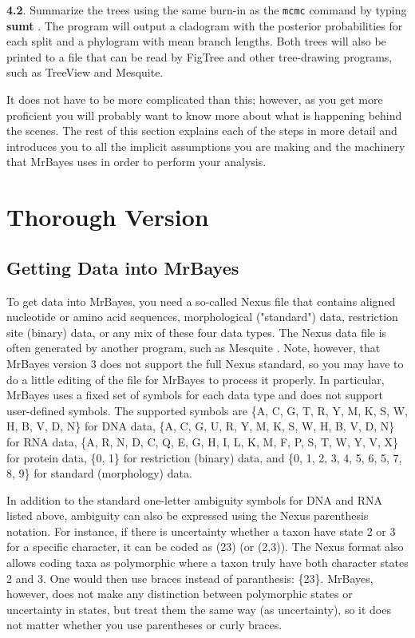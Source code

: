 \documentclass[12pt]{book}
\begin{document}
\textbf{4.2}. Summarize the trees using the same burn-in as the \texttt{mcmc} command by typing
\textbf{sumt} . The program will output a cladogram with the posterior probabilities for each split
and a phylogram with mean branch lengths. Both trees will also be printed to a file that can be
read by FigTree and other tree-drawing programs, such as TreeView and Mesquite.

It does not have to be more complicated than this; however, as you get more proficient you will
probably want to know more about what is happening behind the scenes. The rest of this section
explains each of the steps in more detail and introduces you to all the implicit assumptions you
are making and the machinery that MrBayes uses in order to perform your analysis.

\section{Thorough Version}

\subsection{Getting Data into MrBayes}
To get data into MrBayes, you need a so-called Nexus file that contains aligned nucleotide or amino
acid sequences, morphological ("standard") data, restriction site (binary) data, or any mix of
these four data types. The Nexus data file is often generated by another program, such as Mesquite
\citep{Maddison06}.  Note, however, that MrBayes version 3 does not support the full Nexus
standard, so you may have to do a little editing of the file for MrBayes to process it properly. In
particular, MrBayes uses a fixed set of symbols for each data type and does not support
user-defined symbols. The supported symbols are \{A, C, G, T, R, Y, M, K, S, W, H, B, V, D, N\} for
DNA data, \{A, C, G, U, R, Y, M, K, S, W, H, B, V, D, N\} for RNA data, \{A, R, N, D, C, Q, E, G,
H, I, L, K, M, F, P, S, T, W, Y, V, X\} for protein data, \{0, 1\} for restriction (binary) data,
and \{0, 1, 2, 3, 4, 5, 6, 5, 7, 8, 9\} for standard (morphology) data. 

In addition to the standard one-letter ambiguity symbols for DNA and RNA listed above, ambiguity
can also be expressed using the Nexus parenthesis notation. For instance, if there is uncertainty
whether a taxon have state 2 or 3 for a specific character, it can be coded as (23) (or (2,3)).
The Nexus format also allows coding taxa as polymorphic \textemdash where a taxon truly have both
character states 2 and 3.  One would then use braces instead of paranthesis: \{23\}. MrBayes,
however, does not make any distinction between polymorphic states or uncertainty in states, but
treat them the same way (as uncertainty), so it does not matter whether you use parentheses or
curly braces.
 
\end{document}
